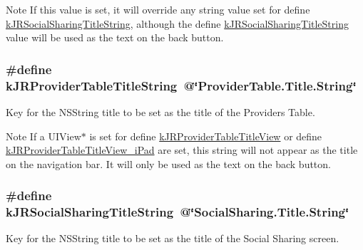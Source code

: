 \begin{DoxyNote}{Note}
If this value is set, it will override any string value set for define \hyperlink{group__custom_interface_ga8fb89469dc5225bf0ea4d1faca6aa2ab}{kJRSocialSharingTitleString}, although the define \hyperlink{group__custom_interface_ga8fb89469dc5225bf0ea4d1faca6aa2ab}{kJRSocialSharingTitleString} value will be used as the text on the back button. 
\end{DoxyNote}
\hypertarget{group__custom_interface_gaf728e45125be9ca6fa515a39a77e7ce7}{
\subsubsection[{kJRProviderTableTitleString}]{\setlength{\rightskip}{0pt plus 5cm}\#define kJRProviderTableTitleString~@\char`\"{}ProviderTable.Title.String\char`\"{}}}
\label{group__custom_interface_gaf728e45125be9ca6fa515a39a77e7ce7}
Key for the {\ttfamily NSString} title to be set as the title of the Providers Table.

\begin{DoxyNote}{Note}
If a UIView$\ast$ is set for define \hyperlink{group__custom_interface_ga0bce97edf43c9cdf53cbcd1aa92c4798}{kJRProviderTableTitleView} or define \hyperlink{group__custom_interface_ga52c322e9fd2aa78cbd64d050f0fd5e41}{kJRProviderTableTitleView\_\-iPad} are set, this string will not appear as the title on the navigation bar. It will only be used as the text on the back button. 
\end{DoxyNote}
\hypertarget{group__custom_interface_ga8fb89469dc5225bf0ea4d1faca6aa2ab}{
\subsubsection[{kJRSocialSharingTitleString}]{\setlength{\rightskip}{0pt plus 5cm}\#define kJRSocialSharingTitleString~@\char`\"{}SocialSharing.Title.String\char`\"{}}}
\label{group__custom_interface_ga8fb89469dc5225bf0ea4d1faca6aa2ab}
Key for the {\ttfamily NSString} title to be set as the title of the Social Sharing screen.

